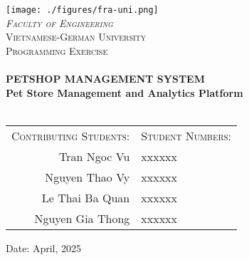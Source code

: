 \begin{titlepage}
    \centering
    \texttt{[image: ./figures/fra-uni.png]}\\[1.5cm]
    \textit{\textsc{\Large Faculty of Engineering}}\\
    \textsc{\Large Vietnamese-German University}\\[0.5cm]
    \textsc{\large Programming Exercise}\\[1.5cm]

    \HRule \\[0.4cm]
    {\huge \bfseries PETSHOP MANAGEMENT SYSTEM \\ Pet Store Management and Analytics Platform \\[0.5cm]}
    \HRule \\[4cm]

    \begin{tabular}{rl}
        \textsc{Contributing Students:} & \textsc{Student Numbers:} \\[0.25cm]
        Tran Ngoc Vu & xxxxxx \\
        Nguyen Thao Vy & xxxxxx \\
        Le Thai Ba Quan & xxxxxx \\
        Nguyen Gia Thong & xxxxxx \\
    \end{tabular}

    \vfill
    \large
    Date: April, 2025
\end{titlepage} 